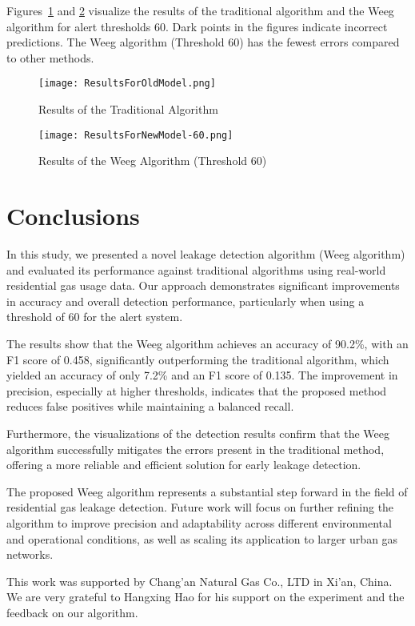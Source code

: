 \documentclass[10pt, sigconf]{acmart}
\begin{document}
Figures~\ref{fig:traditional_model} and \ref{fig:vig_60_model} visualize the results of the traditional algorithm and the Weeg algorithm for alert thresholds 60. Dark points in the figures indicate incorrect predictions. The Weeg algorithm (Threshold 60) has the fewest errors compared to other methods.

\begin{figure}[htbp]  %
  \centering
  \texttt{[image: ResultsForOldModel.png]}
  \caption{Results of the Traditional Algorithm}
  \label{fig:traditional_model}
\end{figure}

\begin{figure}[htbp]  %
  \centering
  \texttt{[image: ResultsForNewModel-60.png]}
  \caption{Results of the Weeg Algorithm (Threshold 60)}
  \label{fig:vig_60_model}
\end{figure}

\section{Conclusions}

In this study, we presented a novel leakage detection algorithm (Weeg algorithm) and evaluated its performance against traditional algorithms using real-world residential gas usage data. Our approach demonstrates significant improvements in accuracy and overall detection performance, particularly when using a threshold of 60 for the alert system.

The results show that the Weeg algorithm achieves an accuracy of 90.2\%, with an F1 score of 0.458, significantly outperforming the traditional algorithm, which yielded an accuracy of only 7.2\% and an F1 score of 0.135. The improvement in precision, especially at higher thresholds, indicates that the proposed method reduces false positives while maintaining a balanced recall.

Furthermore, the visualizations of the detection results confirm that the Weeg algorithm successfully mitigates the errors present in the traditional method, offering a more reliable and efficient solution for early leakage detection.

The proposed Weeg algorithm represents a substantial step forward in the field of residential gas leakage detection. Future work will focus on further refining the algorithm to improve precision and adaptability across different environmental and operational conditions, as well as scaling its application to larger urban gas networks.

\begin{acks}
This work was supported by Chang'an Natural Gas Co., LTD in Xi'an, China. We are very grateful to Hangxing Hao for his support on the experiment and the feedback on our algorithm.
\end{acks}




\end{document}
